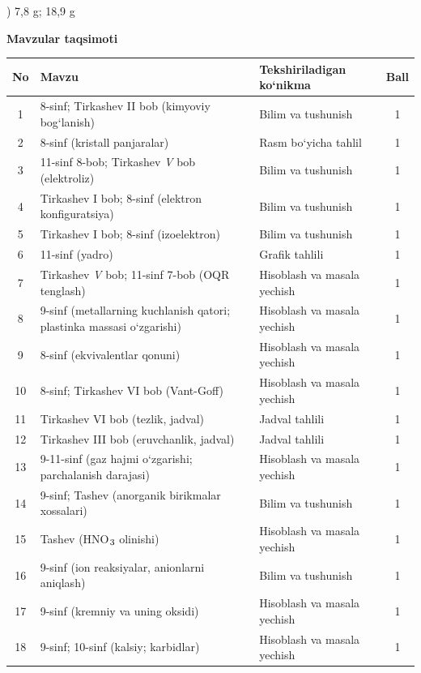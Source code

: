 \documentclass[11pt,a4paper]{article}
\renewcommand{\textsubscript}[1]{\ensuremath{_{\text{\fontsize{8}{8}\selectfont #1}}}}
\begin{document}
) 7,8 g; 18,9 g\par
\par\bigskip\noindent\textbf{Mavzular taqsimoti}\par\smallskip
{\small\noindent\begin{longtable}{|c|p{7.2cm}|p{5.4cm}|c|}\hline \textbf{No} & \textbf{Mavzu} & \textbf{Tekshiriladigan ko`nikma} & \textbf{Ball}\\\hline
1 & 8-sinf; Tirkashev II bob (kimyoviy bog`lanish) & Bilim va tushunish & 1\\\hline
2 & 8-sinf (kristall panjaralar) & Rasm bo`yicha tahlil & 1\\\hline
3 & 11-sinf 8-bob; Tirkashev \textit{V} bob (elektroliz) & Bilim va tushunish & 1\\\hline
4 & Tirkashev I bob; 8-sinf (elektron konfiguratsiya) & Bilim va tushunish & 1\\\hline
5 & Tirkashev I bob; 8-sinf (izoelektron) & Bilim va tushunish & 1\\\hline
6 & 11-sinf (yadro) & Grafik tahlili & 1\\\hline
7 & Tirkashev \textit{V} bob; 11-sinf 7-bob (OQR tenglash) & Hisoblash va masala yechish & 1\\\hline
8 & 9-sinf (metallarning kuchlanish qatori; plastinka massasi o`zgarishi) & Hisoblash va masala yechish & 1\\\hline
9 & 8-sinf (ekvivalentlar qonuni) & Hisoblash va masala yechish & 1\\\hline
10 & 8-sinf; Tirkashev VI bob (Vant-Goff) & Hisoblash va masala yechish & 1\\\hline
11 & Tirkashev VI bob (tezlik, jadval) & Jadval tahlili & 1\\\hline
12 & Tirkashev III bob (eruvchanlik, jadval) & Jadval tahlili & 1\\\hline
13 & 9-11-sinf (gaz hajmi o`zgarishi; parchalanish darajasi) & Hisoblash va masala yechish & 1\\\hline
14 & 9-sinf; Tashev (anorganik birikmalar xossalari) & Bilim va tushunish & 1\\\hline
15 & Tashev (HNO\textsubscript{3} olinishi) & Hisoblash va masala yechish & 1\\\hline
16 & 9-sinf (ion reaksiyalar, anionlarni aniqlash) & Bilim va tushunish & 1\\\hline
17 & 9-sinf (kremniy va uning oksidi) & Hisoblash va masala yechish & 1\\\hline
18 & 9-sinf; 10-sinf (kalsiy; karbidlar) & Hisoblash va masala yechish & 1\\\hline

\end{longtable}}
\end{document}
